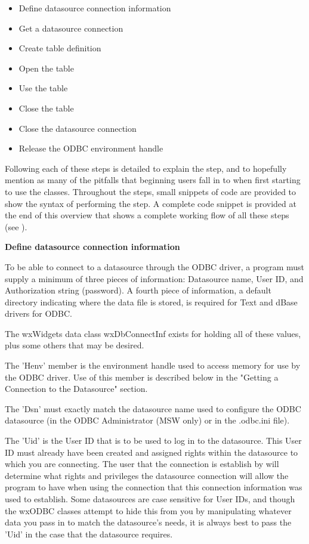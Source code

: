 \begin{itemize}\itemsep=0pt
\item Define datasource connection information
\item Get a datasource connection
\item Create table definition
\item Open the table
\item Use the table
\item Close the table
\item Close the datasource connection
\item Release the ODBC environment handle
\end{itemize}

Following each of these steps is detailed to explain the step, and to 
hopefully mention as many of the pitfalls that beginning users fall in 
to when first starting to use the classes. Throughout the steps, small 
snippets of code are provided to show the syntax of performing the step. A 
complete code snippet is provided at the end of this overview that shows a 
complete working flow of all these steps (see 
).

{\bf Define datasource connection information}

To be able to connect to a datasource through the ODBC driver, a program must 
supply a minimum of three pieces of information: Datasource name, User ID, and 
Authorization string (password). A fourth piece of information, a default 
directory indicating where the data file is stored, is required for Text and 
dBase drivers for ODBC.

The wxWidgets data class wxDbConnectInf exists for holding all of these 
values, plus some others that may be desired.

The 'Henv' member is the environment handle used to access memory for use by the 
ODBC driver. Use of this member is described below in the "Getting a Connection 
to the Datasource" section.

The 'Dsn' must exactly match the datasource name used to configure the ODBC 
datasource (in the ODBC Administrator (MSW only) or in the .odbc.ini file).

The 'Uid' is the User ID that is to be used to log in to the datasource. This 
User ID must already have been created and assigned rights within the 
datasource to which you are connecting. The user that the connection is 
establish by will determine what rights and privileges the datasource 
connection will allow the program to have when using the connection that 
this connection information was used to establish. Some datasources are 
case sensitive for User IDs, and though the wxODBC classes attempt to hide 
this from you by manipulating whatever data you pass in to match the 
datasource's needs, it is always best to pass the 'Uid' in the case that 
the datasource requires.

